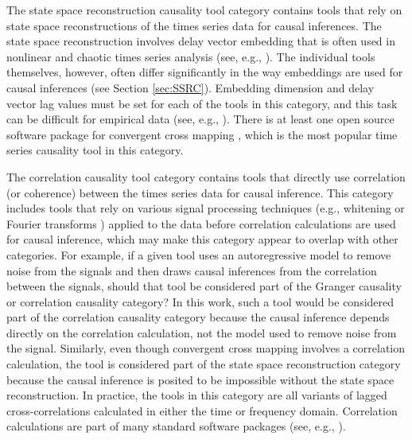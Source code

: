 The state space reconstruction causality tool category contains tools that rely on state space reconstructions of the times series data \cite{Packard1980,ITbook_placeholder,Sauer1991} for causal inferences.  The state space reconstruction involves delay vector embedding that is often used in nonlinear and chaotic times series analysis (see, e.g., \cite{Farmer1987,Casdagli1991}).  The individual tools themselves, however, often differ significantly in the way embeddings are used for causal inferences (see Section \ref{sec:SSRC}).  Embedding dimension and delay vector lag values must be set for each of the tools in this category, and this task can be difficult for empirical data (see, e.g., \cite{Hong2006,Ataei2003,Small2004,Kennel1992}).  There is at least one open source software package for convergent cross mapping \cite{Maher2015}, which is the most popular time series causality tool in this category.

The correlation causality tool category contains tools that directly use correlation (or coherence) between the times series data for causal inference.  This category includes tools that rely on various signal processing techniques (e.g., whitening \cite{Mcnames2007,Box2013} or Fourier transforms \cite{Box2013}) applied to the data before correlation calculations are used for causal inference, which may make this category appear to overlap with other categories.  For example, if a given tool uses an autoregressive model to remove noise from the signals and then draws causal inferences from the correlation between the signals, should that tool be considered part of the Granger causality or correlation causality category?  In this work, such a tool would be considered part of the correlation causality category because the causal inference depends directly on the correlation calculation, not the model used to remove noise from the signal.  Similarly, even though convergent cross mapping involves a correlation calculation, the tool is considered part of the state space reconstruction category because the causal inference is posited to be impossible without the state space reconstruction.  In practice, the tools in this category are all variants of lagged cross-correlations calculated in either the time or frequency domain.  Correlation calculations are part of many standard software packages (see, e.g., \cite{R2012,MATLAB2007,Octave2013}).


